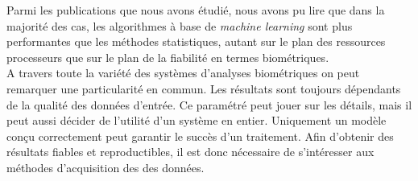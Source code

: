 Parmi les publications que nous avons étudié, nous avons pu lire que dans la majorité des cas, les algorithmes à base de \textit{machine learning} sont plus performantes que les méthodes statistiques, autant sur le plan des ressources processeurs\cite{Hu2008} que sur le plan de la fiabilité en termes biométriques\cite{giotBenchmark}.\\

A travers toute la variété des systèmes d'analyses biométriques on peut remarquer une particularité en commun. Les résultats sont toujours dépendants de la qualité des données d'entrée. Ce paramétré peut jouer sur les détails, mais il peut aussi décider de l'utilité d'un système en entier. Uniquement un modèle conçu correctement peut garantir le succès d'un traitement. Afin d'obtenir des résultats fiables et reproductibles, il est donc nécessaire de s'intéresser aux méthodes d'acquisition des des données.



